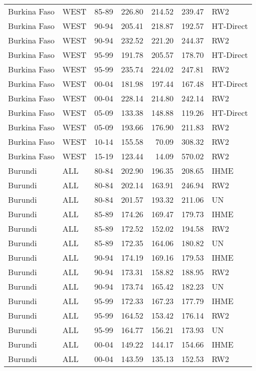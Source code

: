 \begin{longtable}{lllrrrl}
  Burkina Faso & WEST & 85-89 & 226.80 & 214.52 & 239.47 & RW2 \\ 
  Burkina Faso & WEST & 90-94 & 205.41 & 218.87 & 192.57 & HT-Direct \\ 
  Burkina Faso & WEST & 90-94 & 232.52 & 221.20 & 244.37 & RW2 \\ 
  Burkina Faso & WEST & 95-99 & 191.78 & 205.57 & 178.70 & HT-Direct \\ 
  Burkina Faso & WEST & 95-99 & 235.74 & 224.02 & 247.81 & RW2 \\ 
  Burkina Faso & WEST & 00-04 & 181.98 & 197.44 & 167.48 & HT-Direct \\ 
  Burkina Faso & WEST & 00-04 & 228.14 & 214.80 & 242.14 & RW2 \\ 
  Burkina Faso & WEST & 05-09 & 133.38 & 148.88 & 119.26 & HT-Direct \\ 
  Burkina Faso & WEST & 05-09 & 193.66 & 176.90 & 211.83 & RW2 \\ 
  Burkina Faso & WEST & 10-14 & 155.58 & 70.09 & 308.32 & RW2 \\ 
  Burkina Faso & WEST & 15-19 & 123.44 & 14.09 & 570.02 & RW2 \\ 
  Burundi & ALL & 80-84 & 202.90 & 196.35 & 208.65 & IHME \\ 
  Burundi & ALL & 80-84 & 202.14 & 163.91 & 246.94 & RW2 \\ 
  Burundi & ALL & 80-84 & 201.57 & 193.32 & 211.06 & UN \\ 
  Burundi & ALL & 85-89 & 174.26 & 169.47 & 179.73 & IHME \\ 
  Burundi & ALL & 85-89 & 172.52 & 152.02 & 194.58 & RW2 \\ 
  Burundi & ALL & 85-89 & 172.35 & 164.06 & 180.82 & UN \\ 
  Burundi & ALL & 90-94 & 174.19 & 169.16 & 179.53 & IHME \\ 
  Burundi & ALL & 90-94 & 173.31 & 158.82 & 188.95 & RW2 \\ 
  Burundi & ALL & 90-94 & 173.74 & 165.42 & 182.23 & UN \\ 
  Burundi & ALL & 95-99 & 172.33 & 167.23 & 177.79 & IHME \\ 
  Burundi & ALL & 95-99 & 164.52 & 153.42 & 176.14 & RW2 \\ 
  Burundi & ALL & 95-99 & 164.77 & 156.21 & 173.93 & UN \\ 
  Burundi & ALL & 00-04 & 149.22 & 144.17 & 154.66 & IHME \\ 
  Burundi & ALL & 00-04 & 143.59 & 135.13 & 152.53 & RW2 \\ 

\end{longtable}
